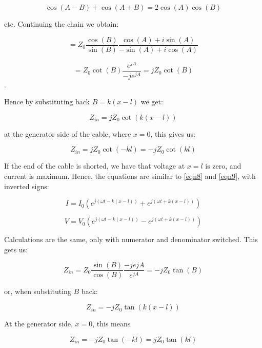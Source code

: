 \documentclass[main.tex]{subfiles}
\begin{document}
$$ \cos(A-B) + \cos(A+B) = 2\cos(A)\cos(B) $$

etc. Continuing the chain we obtain:

$$ = Z_0 \frac{\cos(B)}{\sin(B)} \frac{\cos(A) + i\sin(A)}{-\sin(A) + i\cos(A)} $$

$$ = Z_0 \cot(B) \frac{e^{jA}}{-je^{jA}} = jZ_0 \cot(B) $$.

Hence by substituting back $B = k(x-l)$ we get:

\begin{equation}
	Z_{in} = j Z_0 \cot(k(x-l))
	\label{eqn10}
\end{equation}

at the generator side of the cable, where $x=0$, this gives us:

\begin{equation}
	Z_{in} = j Z_0 \cot(-kl) = -jZ_0\cot(kl)
	\label{eqn11}
\end{equation}

If the end of the cable is shorted, we have that voltage at $x=l$ is zero, and current is maximum. Hence, the equations are similar to \ref{eqn8} and \ref{eqn9}, with inverted signs:

\begin{equation}
	I = I_0(e^{j(\omega t-k(x-l))} + e^{j(\omega t+k(x-l))})
	\label{eqn12}
\end{equation}

\begin{equation}
	V = V_0(e^{j(\omega t-k(x-l))} - e^{j(\omega t+k(x-l))})
	\label{eqn13}
\end{equation}

Calculations are the same, only with numerator and denominator switched. This gets us:

$$ Z_{in} = Z_0 \frac{\sin(B)}{\cos(B)} \frac{-je{jA}}{e^{jA}} = -j Z_0 \tan(B)	$$

or, when substituting $B$ back:

$$ Z_{in} = -j Z_0 \tan(k(x-l)) $$

At the generator side, $x=0$, this means

\begin{equation}
	Z_{in} = -j Z_0 \tan(-kl) = jZ_0\tan(kl)
	\label{eqn11}
\end{equation}
\end{document}
